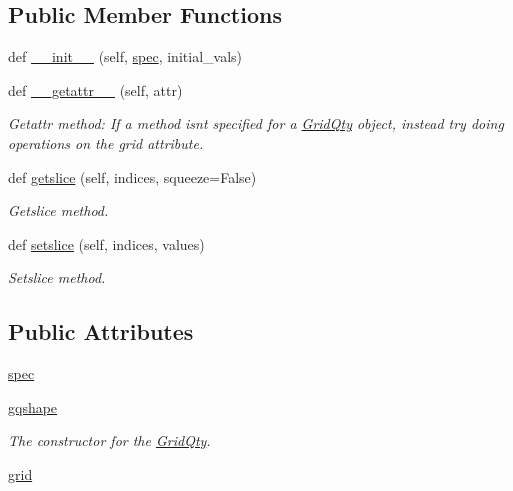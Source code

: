 \subsection*{Public Member Functions}
\begin{DoxyCompactItemize}
\item 
def \hyperlink{classMain__PDE__Repo_1_1src_1_1grid_1_1GridQty_a9adaebfb98afe1a1074e9aad8d6ca879}{\+\_\+\+\_\+init\+\_\+\+\_\+} (self, \hyperlink{classMain__PDE__Repo_1_1src_1_1grid_1_1GridQty_af8f206d6eb9037737417e4fefb52990e}{spec}, initial\+\_\+vals)
\item 
def \hyperlink{classMain__PDE__Repo_1_1src_1_1grid_1_1GridQty_ab9b199129e09cd0f959e553292a75015}{\+\_\+\+\_\+getattr\+\_\+\+\_\+} (self, attr)
\begin{DoxyCompactList}\small\item\em Getattr method\+: If a method isn\textquotesingle{}t specified for a \hyperlink{classMain__PDE__Repo_1_1src_1_1grid_1_1GridQty}{Grid\+Qty} object, instead try doing operations on the grid attribute. \end{DoxyCompactList}\item 
def \hyperlink{classMain__PDE__Repo_1_1src_1_1grid_1_1GridQty_a5080f35125b0d132cc1226d7967996bb}{getslice} (self, indices, squeeze=False)
\begin{DoxyCompactList}\small\item\em Getslice method. \end{DoxyCompactList}\item 
def \hyperlink{classMain__PDE__Repo_1_1src_1_1grid_1_1GridQty_a991e5653e03be1daeabfd5dd512fd75c}{setslice} (self, indices, values)
\begin{DoxyCompactList}\small\item\em Setslice method. \end{DoxyCompactList}\end{DoxyCompactItemize}
\subsection*{Public Attributes}
\begin{DoxyCompactItemize}
\item 
\hyperlink{classMain__PDE__Repo_1_1src_1_1grid_1_1GridQty_af8f206d6eb9037737417e4fefb52990e}{spec}
\item 
\hyperlink{classMain__PDE__Repo_1_1src_1_1grid_1_1GridQty_ad506c5469e4f07ccdcd1cca7239d1555}{gqshape}
\begin{DoxyCompactList}\small\item\em The constructor for the \hyperlink{classMain__PDE__Repo_1_1src_1_1grid_1_1GridQty}{Grid\+Qty}. \end{DoxyCompactList}\item 
\hyperlink{classMain__PDE__Repo_1_1src_1_1grid_1_1GridQty_a78259425113459873f41c8ece6d05c1c}{grid}
\end{DoxyCompactItemize}

